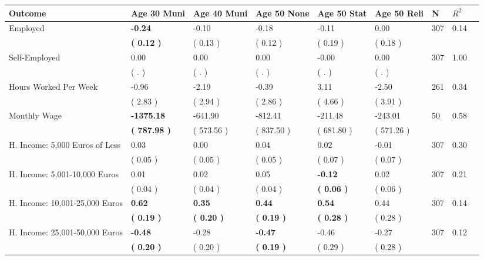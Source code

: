 \begin{tabular}{L{6.2cm} C{1.8cm} C{1.8cm} C{1.8cm} C{1.8cm} C{1.8cm} C{1.8cm} C{0.3cm} C{0.3cm}}
\toprule
 \textbf{Outcome} & \textbf{Age 30 Muni} & \textbf{Age 40 Muni} & \textbf{Age 50 None} & \textbf{Age 50 Stat} & \textbf{Age 50 Reli} & \textbf{N} & \textbf{$ R^2$} \\
\midrule
Employed & \textbf{    -0.24} &     -0.10 &     -0.18 &     -0.11 &      0.00  & 307 &       0.14 \\ 
 & \textbf{(     0.12 )} & (     0.13 ) & (     0.12 ) & (     0.19 ) & (     0.18 )  & \\
Self-Employed &      0.00 &      0.00 &      0.00 &     -0.00 &      0.00  & 307 &       1.00 \\ 
 & (        . ) & (        . ) & (        . ) & (        . ) & (        . )  & \\
Hours Worked Per Week &     -0.96 &     -2.19 &     -0.39 &      3.11 &     -2.50  & 261 &       0.34 \\ 
 & (     2.83 ) & (     2.94 ) & (     2.86 ) & (     4.66 ) & (     3.91 )  & \\
Monthly Wage & \textbf{ -1375.18} &   -641.90 &   -812.41 &   -211.48 &   -243.01  & 50 &       0.58 \\ 
 & \textbf{(   787.98 )} & (   573.56 ) & (   837.50 ) & (   681.80 ) & (   571.26 )  & \\
H. Income: 5,000 Euros of Less &      0.03 &      0.00 &      0.04 &      0.02 &     -0.01  & 307 &       0.30 \\ 
 & (     0.05 ) & (     0.05 ) & (     0.05 ) & (     0.07 ) & (     0.07 )  & \\
H. Income: 5,001-10,000 Euros &      0.01 &      0.02 &      0.05 & \textbf{    -0.12} &      0.02  & 307 &       0.21 \\ 
 & (     0.04 ) & (     0.04 ) & (     0.04 ) & \textbf{(     0.06 )} & (     0.06 )  & \\
H. Income: 10,001-25,000 Euros & \textbf{     0.62} & \textbf{     0.35} & \textbf{     0.44} & \textbf{     0.54} &      0.44  & 307 &       0.14 \\ 
 & \textbf{(     0.19 )} & \textbf{(     0.20 )} & \textbf{(     0.19 )} & \textbf{(     0.28 )} & (     0.28 )  & \\
H. Income: 25,001-50,000 Euros & \textbf{    -0.48} &     -0.28 & \textbf{    -0.47} &     -0.46 &     -0.27  & 307 &       0.12 \\ 
 & \textbf{(     0.20 )} & (     0.20 ) & \textbf{(     0.19 )} & (     0.29 ) & (     0.28 )  & \\

\end{tabular}

